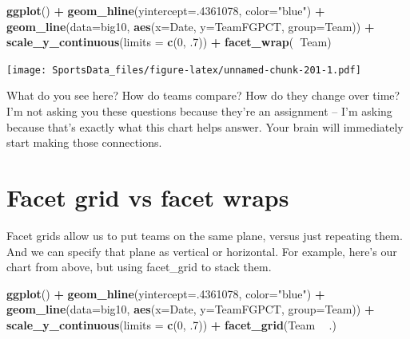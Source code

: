 \documentclass[
]{book}
\newenvironment{Shaded}{\begin{snugshade}}{\end{snugshade}}
\newcommand{\DataTypeTok}[1]{\textcolor[rgb]{0.13,0.29,0.53}{#1}}
\newcommand{\DecValTok}[1]{\textcolor[rgb]{0.00,0.00,0.81}{#1}}
\newcommand{\FloatTok}[1]{\textcolor[rgb]{0.00,0.00,0.81}{#1}}
\newcommand{\KeywordTok}[1]{\textcolor[rgb]{0.13,0.29,0.53}{\textbf{#1}}}
\newcommand{\NormalTok}[1]{#1}
\newcommand{\OperatorTok}[1]{\textcolor[rgb]{0.81,0.36,0.00}{\textbf{#1}}}
\newcommand{\StringTok}[1]{\textcolor[rgb]{0.31,0.60,0.02}{#1}}
\begin{document}
\begin{Shaded}
\begin{Highlighting}[]
\KeywordTok{ggplot}\NormalTok{() }\OperatorTok{+}\StringTok{ }
\StringTok{  }\KeywordTok{geom_hline}\NormalTok{(}\DataTypeTok{yintercept=}\NormalTok{.}\DecValTok{4361078}\NormalTok{, }\DataTypeTok{color=}\StringTok{"blue"}\NormalTok{) }\OperatorTok{+}\StringTok{ }
\StringTok{  }\KeywordTok{geom_line}\NormalTok{(}\DataTypeTok{data=}\NormalTok{big10, }\KeywordTok{aes}\NormalTok{(}\DataTypeTok{x=}\NormalTok{Date, }\DataTypeTok{y=}\NormalTok{TeamFGPCT, }\DataTypeTok{group=}\NormalTok{Team)) }\OperatorTok{+}\StringTok{ }
\StringTok{  }\KeywordTok{scale_y_continuous}\NormalTok{(}\DataTypeTok{limits =} \KeywordTok{c}\NormalTok{(}\DecValTok{0}\NormalTok{, }\FloatTok{.7}\NormalTok{)) }\OperatorTok{+}\StringTok{ }
\StringTok{  }\KeywordTok{facet_wrap}\NormalTok{(}\OperatorTok{~}\NormalTok{Team)}
\end{Highlighting}
\end{Shaded}

\texttt{[image: SportsData\_files/figure-latex/unnamed-chunk-201-1.pdf]}

What do you see here? How do teams compare? How do they change over time? I'm not asking you these questions because they're an assignment -- I'm asking because that's exactly what this chart helps answer. Your brain will immediately start making those connections.

\hypertarget{facet-grid-vs-facet-wraps}{%
\section{Facet grid vs facet wraps}\label{facet-grid-vs-facet-wraps}}

Facet grids allow us to put teams on the same plane, versus just repeating them. And we can specify that plane as vertical or horizontal. For example, here's our chart from above, but using facet\_grid to stack them.

\begin{Shaded}
\begin{Highlighting}[]
\KeywordTok{ggplot}\NormalTok{() }\OperatorTok{+}\StringTok{ }
\StringTok{  }\KeywordTok{geom_hline}\NormalTok{(}\DataTypeTok{yintercept=}\NormalTok{.}\DecValTok{4361078}\NormalTok{, }\DataTypeTok{color=}\StringTok{"blue"}\NormalTok{) }\OperatorTok{+}\StringTok{ }
\StringTok{  }\KeywordTok{geom_line}\NormalTok{(}\DataTypeTok{data=}\NormalTok{big10, }\KeywordTok{aes}\NormalTok{(}\DataTypeTok{x=}\NormalTok{Date, }\DataTypeTok{y=}\NormalTok{TeamFGPCT, }\DataTypeTok{group=}\NormalTok{Team)) }\OperatorTok{+}\StringTok{ }
\StringTok{  }\KeywordTok{scale_y_continuous}\NormalTok{(}\DataTypeTok{limits =} \KeywordTok{c}\NormalTok{(}\DecValTok{0}\NormalTok{, }\FloatTok{.7}\NormalTok{)) }\OperatorTok{+}\StringTok{ }
\StringTok{  }\KeywordTok{facet_grid}\NormalTok{(Team }\OperatorTok{~}\StringTok{ }\NormalTok{.)}
\end{Highlighting}
\end{Shaded}
\end{document}
